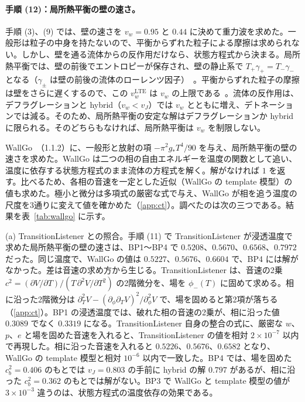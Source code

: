 \documentclass[a4paper,10pt]{ltjsarticle}
\begin{document}
\paragraph{手順 (12)：局所熱平衡の壁の速さ。}手順 (3)、(9) では、壁の速さを $v_w=0.95$ と $0.44$ に決めて重力波を求めた。一般形は粒子の中身を持たないので、平衡からずれた粒子による摩擦は求められない。しかし、壁を通る流体からの反作用だけなら、状態方程式から決まる。局所熱平衡では、壁の前後でエントロピーが保存され、壁の静止系で $T_+\gamma_+=T_-\gamma_-$ となる（$\gamma_\pm$ は壁の前後の流体のローレンツ因子）~\cite{ai23}。平衡からずれた粒子の摩擦は壁をさらに遅くするので、この $v_w^{\mathrm{LTE}}$ は $v_w$ の上限である~\cite{wallgo}。流体の反作用は、デフラグレーションと hybrid（$v_w<v_J$）では $v_w$ とともに増え、デトネーションでは減る。そのため、局所熱平衡の安定な解はデフラグレーションか hybrid に限られる。そのどちらもなければ、局所熱平衡は $v_w$ を制限しない。

WallGo~\cite{wallgo}（1.1.2）に、一般形と放射の項 $-\pi^2g_*T^4/90$ を与え、局所熱平衡の壁の速さを求めた。WallGo は二つの相の自由エネルギーを温度の関数として追い、温度に依存する状態方程式のまま流体の方程式を解く。解がなければ $1$ を返す。比べるため、各相の音速を一定とした近似（WallGo の template 模型）の値も求めた。極小と微分は多項式の厳密な式で与え、WallGo が相を追う温度の尺度を3通りに変えて値を確かめた（\ref{app:ct}）。調べたのは次の三つである。結果を表~\ref{tab:wallgo} に示す。

(a) TransitionListener との照合。手順 (11) で TransitionListener が浸透温度で求めた局所熱平衡の壁の速さは、BP1〜BP4 で $0.5208$、$0.5670$、$0.6568$、$0.7972$ だった。同じ温度で、WallGo の値は $0.5227$、$0.5676$、$0.6604$ で、BP4 には解がなかった。差は音速の求め方から生じる。TransitionListener は、音速の2乗 $c^2=(\partial V/\partial T)/(T\,\partial^2V/\partial T^2)$ の2階微分を、場を $\phi_-(T)$ に固めて求める。相に沿った2階微分は $\partial_T^2V-(\partial_\phi\partial_TV)^2/\partial_\phi^2V$ で、場を固めると第2項が落ちる（\ref{app:ct}）。BP1 の浸透温度では、破れた相の音速の2乗が、相に沿った値 $0.3089$ でなく $0.3319$ になる。TransitionListener 自身の整合の式に、厳密な $w$、$p$、$e$ と場を固めた音速を入れると、TransitionListener の値を相対 $2\times10^{-7}$ 以内で再現した。相に沿った音速を入れると $0.5226$、$0.5676$、$0.6582$ となり、WallGo の template 模型と相対 $10^{-6}$ 以内で一致した。BP4 では、場を固めた $c_b^2=0.406$ のもとでは $v_J=0.803$ の手前に hybrid の解 $0.797$ があるが、相に沿った $c_b^2=0.362$ のもとでは解がない。BP3 で WallGo と template 模型の値が $3\times10^{-3}$ 違うのは、状態方程式の温度依存の効果である。
\end{document}
